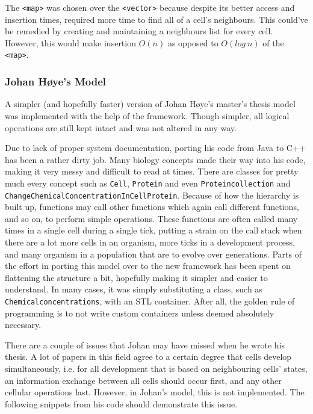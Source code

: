 The \texttt{<map>} was chosen over the \texttt{<vector>} because despite its better access and insertion times, required more time to find all of a cell's neighbours. This could've be remedied by creating and maintaining a neighbours list for every cell. However, this would make insertion $O(n)$ as opposed to $O(log~n)$ of the \texttt{<map>}.


\subsubsection{Johan H{\o}ye's Model}
A simpler (and hopefully faster) version of Johan H{\o}ye's master's thesis\cite{hoye2006} model was implemented with the help of the framework. Though simpler, all logical operations are still kept intact and was not altered in any way.

Due to lack of proper system documentation, porting his code from Java to C++ has been a rather dirty job. Many biology concepts made their way into his code, making it very messy and difficult to read at times. There are classes for pretty much every concept such as \texttt{Cell}, \texttt{Protein} and even \texttt{Proteincollection} and \texttt{ChangeChemicalConcentrationInCellProtein}. Because of how the hierarchy is built up, functions may call other functions which again call different functions, and so on, to perform simple operations. These functions are often called many times in a single cell during a single tick, putting a strain on the call stack when there are a lot more cells in an organism, more ticks in a development process, and many organism in a population that are to evolve over generations. Parts of the effort in porting this model over to the new framework has been spent on flattening the structure a bit, hopefully making it simpler and easier to understand. In many cases, it was simply substituting a class, such as \texttt{Chemicalconcentrations}, with an STL container. After all, the golden rule of programming is to not write custom containers unless deemed absolutely necessary.

There are a couple of issues that Johan may have missed when he wrote his thesis. A lot of papers in this field agree to a certain degree that cells develop simultaneously, i.e. for all development that is based on neighbouring cells' states, an information exchange between all cells should occur first, and any other cellular operations last. However, in Johan's model, this is not implemented. The following snippets from his code should demonstrate this issue.

